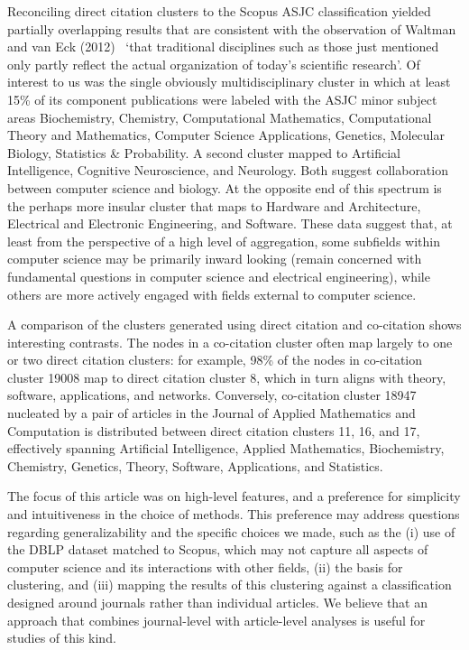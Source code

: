 Reconciling direct citation clusters to the Scopus ASJC classification yielded partially overlapping results that are consistent with the observation of Waltman and van Eck (2012)~\cite{waltman_new_2012} `that traditional disciplines such as those just mentioned only partly reflect the actual organization of today’s scientific research'. Of interest to us was the single obviously multidisciplinary cluster in which at least 15\% of its component publications were labeled with the ASJC minor subject areas Biochemistry, Chemistry, Computational Mathematics, Computational Theory and Mathematics, Computer Science Applications, Genetics, Molecular Biology, Statistics \& Probability. A second cluster mapped to Artificial Intelligence, Cognitive Neuroscience, and Neurology.  Both suggest collaboration between computer science and biology. At the opposite end of this spectrum is the perhaps more insular cluster that maps to Hardware and Architecture, Electrical and Electronic Engineering, and Software. These data suggest that, at least from the perspective of a high level of aggregation, some subfields within computer science may be primarily inward looking (remain concerned with fundamental questions in computer science and electrical engineering), while others are more actively engaged with fields external to computer science. 

A comparison of the clusters generated using direct citation and co-citation shows interesting contrasts. 
The nodes in a co-citation cluster often map largely to one or two direct citation clusters: for example, 98\% of the nodes in co-citation cluster 19008 map to direct citation cluster 8, which in turn aligns with theory, software, applications, and networks. 
Conversely, co-citation cluster 18947 nucleated by a pair of articles in the Journal of Applied Mathematics and Computation is distributed between direct citation clusters 11, 16, and 17, effectively spanning Artificial Intelligence, Applied Mathematics, Biochemistry, Chemistry, Genetics, Theory, Software, Applications, and Statistics. 

The focus of this article was on high-level features, and a preference for simplicity and intuitiveness in the choice of methods. This preference may address questions  regarding generalizability and the specific choices we made, such as the (i) use of the DBLP dataset matched to Scopus, which may not capture all aspects of computer science and its interactions with other fields, (ii) the basis for clustering, and (iii) mapping the results of this clustering against a classification designed around journals rather than individual articles. We believe that an approach that combines journal-level  with article-level analyses is useful for studies of this kind.  

